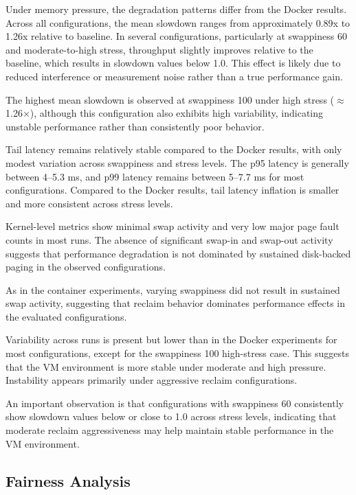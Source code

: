 \documentclass[conference]{IEEEtran}
\begin{document}
Under memory pressure, the degradation patterns differ from the Docker results. Across all configurations, the mean slowdown ranges from approximately 0.89x to 1.26x relative to baseline. In several configurations, particularly at swappiness 60 and moderate-to-high stress, throughput slightly improves relative to the baseline, which results in slowdown values below 1.0. This effect is likely due to reduced interference or measurement noise rather than a true performance gain.

The highest mean slowdown is observed at swappiness 100 under high stress ($\approx$ 1.26×), although this configuration also exhibits high variability, indicating unstable performance rather than consistently poor behavior.

Tail latency remains relatively stable compared to the Docker results, with only modest variation across swappiness and stress levels. The p95 latency is generally between 4--5.3 ms, and p99 latency remains between 5--7.7 ms for most configurations. Compared to the Docker results, tail latency inflation is smaller and more consistent across stress levels.

Kernel-level metrics show minimal swap activity and very low major page fault counts in most runs. The absence of significant swap-in and swap-out activity suggests that performance degradation is not dominated by sustained disk-backed paging in the observed configurations.

As in the container experiments, varying swappiness did not result in sustained swap activity, suggesting that reclaim behavior dominates performance effects in the evaluated configurations.

Variability across runs is present but lower than in the Docker experiments for most configurations, except for the swappiness 100 high-stress case. This suggests that the VM environment is more stable under moderate and high pressure. Instability appears primarily under aggressive reclaim configurations.

An important observation is that configurations with swappiness 60 consistently show slowdown values below or close to 1.0 across stress levels, indicating that moderate reclaim aggressiveness may help maintain stable performance in the VM environment.

\subsection{Fairness Analysis}
\end{document}
